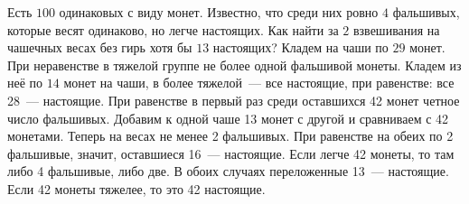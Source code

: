 \problem
Есть $100$ одинаковых с виду монет.
Известно, что среди них ровно $4$ фальшивых, которые весят одинаково, но легче
настоящих.
Как найти за $2$ взвешивания на чашечных весах без гирь хотя бы $13$ настоящих?
\solution
Кладем на чаши по $29$ монет.
При неравенстве в тяжелой группе не более одной фальшивой монеты.
Кладем из неё по $14$ монет на чаши, в более тяжелой~--- все настоящие, при
равенстве: все 28~--- настоящие.
При равенстве в первый раз среди оставшихся 42 монет четное число фальшивых.
Добавим к одной чаше 13 монет с другой и сравниваем с 42 монетами.
Теперь на весах не менее 2 фальшивых.
При равенстве на обеих по 2 фальшивые, значит, оставшиеся 16~--- настоящие.
Если легче 42 монеты, то там либо 4 фальшивые, либо две.
В обоих случаях переложенные 13~--- настоящие.
Если 42 монеты тяжелее, то это 42 настоящие.
\endproblem
